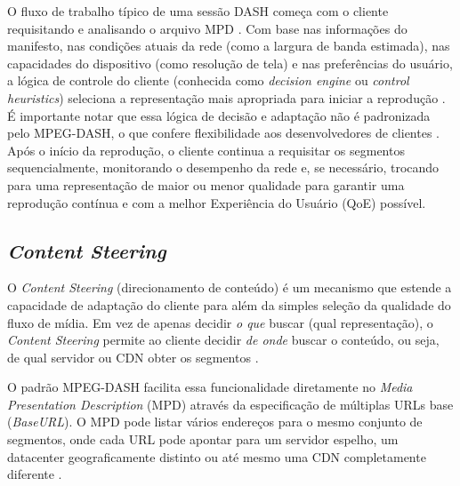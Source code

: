 O fluxo de trabalho típico de uma sessão DASH começa com o cliente requisitando e analisando o arquivo MPD \cite{sodagar2011mpegdash}. Com base nas informações do manifesto, nas condições atuais da rede (como a largura de banda estimada), nas capacidades do dispositivo (como resolução de tela) e nas preferências do usuário, a lógica de controle do cliente (conhecida como \textit{decision engine} ou \textit{control heuristics}) seleciona a representação mais apropriada para iniciar a reprodução \cite{thang2012adaptive}. É importante notar que essa lógica de decisão e adaptação não é padronizada pelo MPEG-DASH, o que confere flexibilidade aos desenvolvedores de clientes \cite{sodagar2011mpegdash}. Após o início da reprodução, o cliente continua a requisitar os segmentos sequencialmente, monitorando o desempenho da rede e, se necessário, trocando para uma representação de maior ou menor qualidade para garantir uma reprodução contínua e com a melhor Experiência do Usuário (QoE) possível.

\subsection{\textit{Content Steering}}

O \textit{Content Steering} (direcionamento de conteúdo) é um mecanismo que estende a capacidade de adaptação do cliente para além da simples seleção da qualidade do fluxo de mídia. Em vez de apenas decidir \textit{o que} buscar (qual representação), o \textit{Content Steering} permite ao cliente decidir \textit{de onde} buscar o conteúdo, ou seja, de qual servidor ou CDN obter os segmentos \cite{sodagar2011mpegdash}.

O padrão MPEG-DASH facilita essa funcionalidade diretamente no \textit{Media Presentation Description} (MPD) através da especificação de múltiplas URLs base (\textit{BaseURL}). O MPD pode listar vários endereços para o mesmo conjunto de segmentos, onde cada URL pode apontar para um servidor espelho, um datacenter geograficamente distinto ou até mesmo uma CDN completamente diferente \cite{sodagar2011mpegdash}.

